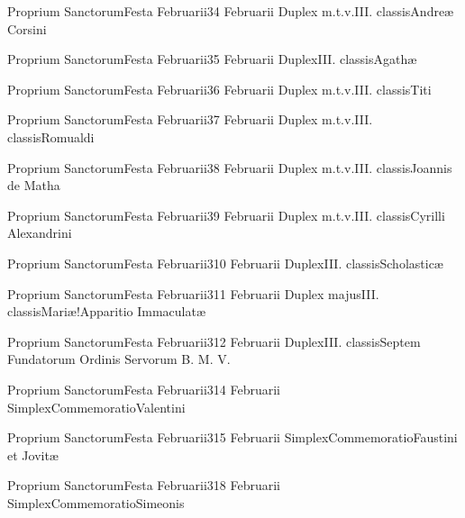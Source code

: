 \documentclass[psalterium-feriale.tex]{subfiles}
\begin{document}
	{Proprium Sanctorum}{Festa Februarii}{3}{4 Februarii}
	{Duplex m.t.v.}{III. classis}{Andreæ Corsini}
	{}
	{}

	{Proprium Sanctorum}{Festa Februarii}{3}{5 Februarii}
	{Duplex}{III. classis}{Agathæ}
	{}
	{}
\psalmodiapropria

	{Proprium Sanctorum}{Festa Februarii}{3}{6 Februarii}
	{Duplex m.t.v.}{III. classis}{Titi}
	{}
	{}

	{Proprium Sanctorum}{Festa Februarii}{3}{7 Februarii}
	{Duplex m.t.v.}{III. classis}{Romualdi}
	{}
	{}

	{Proprium Sanctorum}{Festa Februarii}{3}{8 Februarii}
	{Duplex m.t.v.}{III. classis}{Joannis de Matha}
	{}
	{}

	{Proprium Sanctorum}{Festa Februarii}{3}{9 Februarii}
	{Duplex m.t.v.}{III. classis}{Cyrilli Alexandrini}
	{}
	{}

	{Proprium Sanctorum}{Festa Februarii}{3}{10 Februarii}
	{Duplex}{III. classis}{Scholasticæ}
	{}
	{}

	{Proprium Sanctorum}{Festa Februarii}{3}{11 Februarii}
	{Duplex majus}{III. classis}{Mariæ!Apparitio Immaculatæ}
	{}
	{}
\psalmodiapropria

	{Proprium Sanctorum}{Festa Februarii}{3}{12 Februarii}
	{Duplex}{III. classis}{Septem Fundatorum Ordinis Servorum B. M. V.}
	{}
	{}

	{Proprium Sanctorum}{Festa Februarii}{3}{14 Februarii}
	{Simplex}{Commemoratio}{Valentini}
	{}
	{}

	{Proprium Sanctorum}{Festa Februarii}{3}{15 Februarii}
	{Simplex}{Commemoratio}{Faustini et Jovitæ}
	{}
	{}

	{Proprium Sanctorum}{Festa Februarii}{3}{18 Februarii}
	{Simplex}{Commemoratio}{Simeonis}
	{}
	{}
\end{document}
